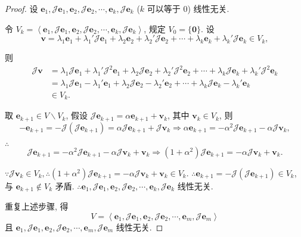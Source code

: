 \documentclass{ctexart}
\begin{document}
\begin{proof}
    设 $\boldsymbol{e}_1,\mathcal{J}\boldsymbol{e}_1,\boldsymbol{e}_2,\mathcal{J}\boldsymbol{e}_2,\cdots,\boldsymbol{e}_k,\mathcal{J}\boldsymbol{e}_k$ ($k$ 可以等于 $0$) 线性无关.
    
    令 $V_k=\left<\boldsymbol{e}_1,\mathcal{J}\boldsymbol{e}_1,\boldsymbol{e}_2,\mathcal{J}\boldsymbol{e}_2,\cdots,\boldsymbol{e}_k,\mathcal{J}\boldsymbol{e}_k\right>$, 规定 $V_0=\{\boldsymbol{0}\}$. 设
    \[\boldsymbol{v}=\lambda_1\boldsymbol{e}_1+\lambda_1'\mathcal{J}\boldsymbol{e}_1+\lambda_2\boldsymbol{e}_2+\lambda_2'\mathcal{J}\boldsymbol{e}_2+\cdots+\lambda_k\boldsymbol{e}_k+\lambda_k'\mathcal{J}\boldsymbol{e}_k\in V_k,\]

    则
    \begin{align*}
        \mathcal{J}\boldsymbol{v} & =\lambda_1\mathcal{J}\boldsymbol{e}_1+\lambda_1'\mathcal{J}^2\boldsymbol{e}_1+\lambda_2\mathcal{J}\boldsymbol{e}_2+\lambda_2'\mathcal{J}^2\boldsymbol{e}_2+\cdots+\lambda_k\mathcal{J}\boldsymbol{e}_k+\lambda_k'\mathcal{J}^2\boldsymbol{e}_k \\
        & =\lambda_1\mathcal{J}\boldsymbol{e}_1-\lambda_1'\boldsymbol{e}_1+\lambda_2\mathcal{J}\boldsymbol{e}_2-\lambda_2'\boldsymbol{e}_2+\cdots+\lambda_k\mathcal{J}\boldsymbol{e}_k-\lambda_k'\boldsymbol{e}_k \\
        & \in V_k.
    \end{align*}

    取 $\boldsymbol{e}_{k+1}\in V\backslash V_k$, 假设 $\mathcal{J}\boldsymbol{e}_{k+1}=\alpha\boldsymbol{e}_{k+1}+\boldsymbol{v}_k$, 其中 $\boldsymbol{v}_k\in V_k$, 则
    \[-\boldsymbol{e}_{k+1}=-\mathcal{J}(\mathcal{J}\boldsymbol{e}_{k+1})=\alpha\mathcal{J}\boldsymbol{e}_{k+1}+\mathcal{J}\boldsymbol{v}_k\Rightarrow\alpha\boldsymbol{e}_{k+1}=-\alpha^2\mathcal{J}\boldsymbol{e}_{k+1}-\alpha\mathcal{J}\boldsymbol{v}_k,\]
    
    $\therefore$
    \[\mathcal{J}\boldsymbol{e}_{k+1}=-\alpha^2\mathcal{J}\boldsymbol{e}_{k+1}-\alpha\mathcal{J}\boldsymbol{v}_k+\boldsymbol{v}_k\Rightarrow(1+\alpha^2)\mathcal{J}\boldsymbol{e}_{k+1}=-\alpha\mathcal{J}\boldsymbol{v}_k+\boldsymbol{v}_k.\]

    $\because\mathcal{J}\boldsymbol{v}_k\in V_k,\therefore(1+\alpha^2)\mathcal{J}\boldsymbol{e}_{k+1}=-\alpha\mathcal{J}\boldsymbol{v}_k+\boldsymbol{v}_k\in V_k$. $\therefore\boldsymbol{e}_{k+1}=-\mathcal{J}(\mathcal{J}\boldsymbol{e}_{k+1})\in V_k$, 与 $\boldsymbol{e}_{k+1}\notin V_k$ 矛盾. $\therefore\boldsymbol{e}_1,\mathcal{J}\boldsymbol{e}_1,\boldsymbol{e}_2,\mathcal{J}\boldsymbol{e}_2,\cdots,\boldsymbol{e}_k,\mathcal{J}\boldsymbol{e}_k$ 线性无关.

    重复上述步骤, 得
    \[V=\left<\boldsymbol{e}_1,\mathcal{J}\boldsymbol{e}_1,\boldsymbol{e}_2,\mathcal{J}\boldsymbol{e}_2,\cdots,\boldsymbol{e}_m,\mathcal{J}\boldsymbol{e}_m\right>\]
    且 $\boldsymbol{e}_1,\mathcal{J}\boldsymbol{e}_1,\boldsymbol{e}_2,\mathcal{J}\boldsymbol{e}_2,\cdots,\boldsymbol{e}_m,\mathcal{J}\boldsymbol{e}_m$ 线性无关.
\end{proof}
\end{document}

